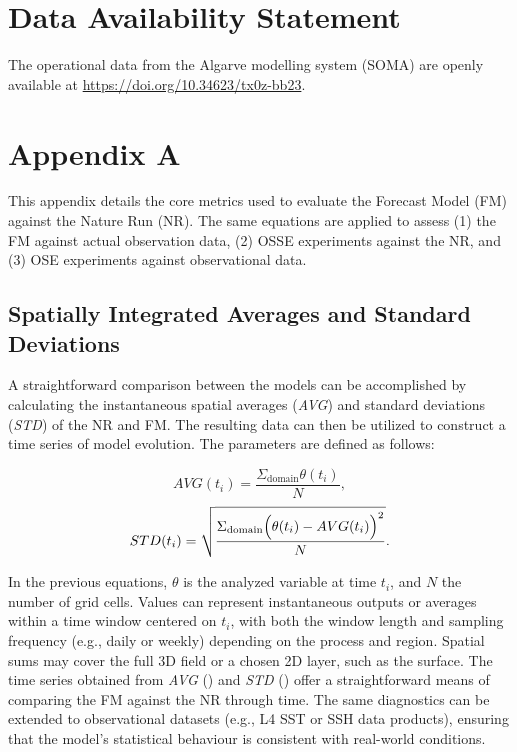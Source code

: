 \section{Data Availability Statement}
The operational data from the Algarve modelling system (SOMA) are openly available at \href{https://doi.org/10.34623/tx0z-bb23}{https://doi.org/10.34623/tx0z-bb23}.

\section{Appendix A} \label{sec:ossedesign_appxA}
This appendix details the core metrics used to evaluate the Forecast Model (FM) against the Nature Run (NR). The same equations are applied to assess (1) the FM against actual observation data, (2) OSSE experiments against the NR, and (3) OSE experiments against observational data.

\subsection{Spatially Integrated Averages and Standard Deviations}
A straightforward comparison between the models can be accomplished by calculating the instantaneous spatial averages (\textit{AVG}) and standard deviations (\textit{STD}) of the NR and FM. The resulting data can then be utilized to construct a time series of model evolution. The parameters are defined as follows:

\begin{equation}\label{eq:cp2_avg}
	AVG(t_{i}) = \frac{\Sigma_{\text{domain}}\theta(t_{i})}{N},
\end{equation}
\begin{equation}\label{eq:cp2_std}
	STD(t_{i}) = \sqrt{\frac{\Sigma_{\text{domain}} \Bigl( \theta(t_{i})-AVG(t_{i}) \Bigr)^2}{N}}.
\end{equation}

In the previous equations, $\theta$ is the analyzed variable at time $t_i$, and $N$ the number of grid cells. Values can represent instantaneous outputs or averages within a time window centered on $t_i$, with both the window length and sampling frequency (e.g., daily or weekly) depending on the process and region. Spatial sums may cover the full 3D field or a chosen 2D layer, such as the surface. The time series obtained from \textit{AVG} () and \textit{STD} () offer a straightforward means of comparing the FM against the NR through time. The same diagnostics can be extended to observational datasets (e.g., L4 SST or SSH data products), ensuring that the model's statistical behaviour is consistent with real-world conditions.


